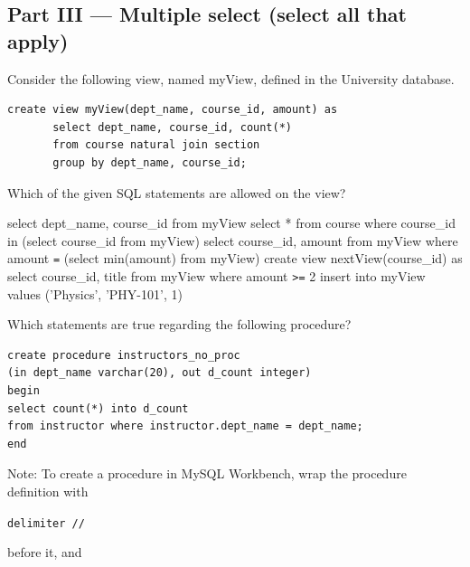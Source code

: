 \documentclass[12pt]{exam}
\begin{document}
\begin{questions}
\section*{Part III — Multiple select (select all that apply)}

\begin{minipage}{\linewidth}
\question[5]
Consider the following view, named myView, defined in the University database.\par\vspace{0.5em}
\begin{verbatim}
create view myView(dept_name, course_id, amount) as
       select dept_name, course_id, count(*)
       from course natural join section
       group by dept_name, course_id;
\end{verbatim}
Which of the given SQL statements are allowed on the view?\par\vspace{0.5em}
\begin{checkboxes}
    \CorrectChoice select dept\_name, course\_id from myView
    \CorrectChoice select * from course where course\_id in (select course\_id from myView)
    \CorrectChoice select course\_id, amount from myView where amount \texttt{=} (select min(amount) from myView)
    \choice create view nextView(course\_id) as select course\_id, title from myView where amount \texttt{>=} 2
    \choice insert into myView values ('Physics', 'PHY-101', 1)
\end{checkboxes}
\end{minipage}\vspace{1em}

\begin{minipage}{\linewidth}
\question[4]
Which statements are true regarding the following procedure?\par\vspace{0.5em}

\begin{verbatim}
create procedure instructors_no_proc
(in dept_name varchar(20), out d_count integer)
begin
select count(*) into d_count 
from instructor where instructor.dept_name = dept_name;
end
\end{verbatim}

{\footnotesize Note: To create a procedure in MySQL Workbench, wrap the procedure definition with

\texttt{delimiter //} 

before it, and 

}
\end{minipage}
\end{questions}
\end{document}
